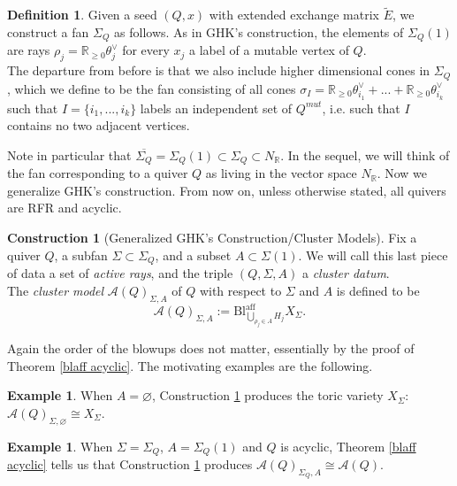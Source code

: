 \documentclass[11pt]{amsart}
\theoremstyle{definition}
\newtheorem{defn}[thm]{Definition}
\newtheorem{con}[thm]{Construction}
\newtheorem{exmp}[thm]{Example}
\theoremstyle{remark}
\renewcommand{\emptyset}{\varnothing}
\numberwithin{equation}{section}
\begin{document}
\begin{defn}\label{sigmaq}
    Given a seed $(Q, x)$ with extended exchange matrix $\tilde{E}$, we construct a fan $\Sigma_Q$ as follows. As in GHK's construction, the elements of $\Sigma_Q(1)$ are rays $\rho_j = \mathbb{R}_{\geq 0} \theta_j^\vee$ for every $x_j$ a label of a mutable vertex of $Q$.\\
    
    The departure from before is that we also include higher dimensional cones in $\Sigma_Q$, which we define to be the fan consisting of all cones $\sigma_I = \mathbb{R}_{\geq 0} \theta_{i_1}^\vee + ... + \mathbb{R}_{\geq 0} \theta_{i_k}^\vee$ such that $I = \{i_1, ..., i_k\}$ labels an independent set of $Q^{mut}$, i.e. such that $I$ contains no two adjacent vertices.
\end{defn}

Note in particular that $\overline{\Sigma_Q} = \Sigma_Q(1) \subset \Sigma_Q \subset N_\mathbb{R}$. In the sequel, we will think of the fan corresponding to a quiver $Q$ as living in the vector space $N_\mathbb{R}$. Now we generalize GHK's construction. From now on, unless otherwise stated, all quivers are RFR and acyclic.

\begin{con}[Generalized GHK's Construction/Cluster Models]\label{GHK+}
    Fix a quiver $Q$, a subfan $\Sigma \subset \Sigma_Q$, and a subset $A \subset \Sigma(1)$. We will call this last piece of data a set of \textit{active rays}, and the triple $(Q, \Sigma, A)$ a \textit{cluster datum}.\\
    
    The \textit{cluster model} $\mathcal{A}(Q)_{\Sigma, A}$ of $Q$ with respect to $\Sigma$ and $A$ is defined to be $$\mathcal{A}(Q)_{\Sigma, A} :=\text{Bl}_{\bigcup_{\rho_j \in A} H_j}^{\text{aff}} X_\Sigma.$$
\end{con}

Again the order of the blowups does not matter, essentially by the proof of Theorem \ref{blaff acyclic}. The motivating examples are the following.

\begin{exmp}
    When $A = \emptyset$, Construction \ref{GHK+} produces the toric variety $X_\Sigma$: $\mathcal{A}(Q)_{\Sigma, \emptyset} \cong X_{\Sigma}$.
\end{exmp}

\begin{exmp}
    When $\Sigma = \Sigma_Q$, $A = \Sigma_Q(1)$ and $Q$ is acyclic, Theorem \ref{blaff acyclic} tells us that Construction \ref{GHK+} produces $\mathcal{A}(Q)_{\Sigma_Q,A} \cong \mathcal{A}(Q)$.
\end{exmp}
\end{document}
